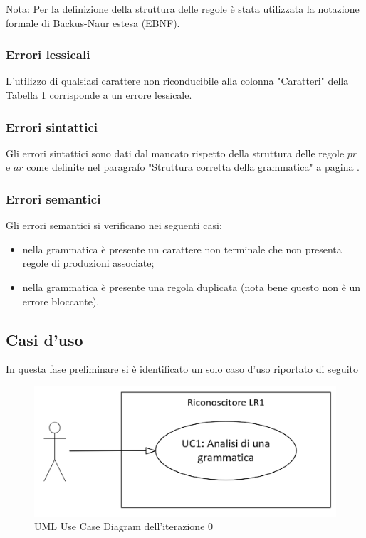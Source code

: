 \documentclass[12pt]{article}
\begin{document}
\underline{Nota:} Per la definizione della struttura delle regole è stata utilizzata la notazione formale di Backus-Naur estesa (EBNF).

\subsubsection{Errori lessicali}
L'utilizzo di qualsiasi carattere non riconducibile alla colonna "Caratteri" della Tabella 1 corrisponde a un errore lessicale.

\subsubsection{Errori sintattici}
Gli errori sintattici sono dati dal mancato rispetto della struttura delle regole $pr$ e $ar$ come definite nel paragrafo "Struttura corretta della grammatica" a pagina \pageref{struttura}.

\subsubsection{Errori semantici}
Gli errori semantici si verificano nei seguenti casi:
\begin{itemize}
\item nella grammatica è presente un carattere non terminale che non presenta regole di produzioni associate;
\item nella grammatica è presente una regola duplicata (\underline{nota bene} questo \underline{non} è un errore bloccante).
\end{itemize}
\pagebreak

\subsection{Casi d'uso}
In questa fase preliminare si è identificato un solo caso d'uso riportato di seguito

\begin{figure}[h]
\centering
\includegraphics[scale=1]{immagini/UC_v1.png}
\caption{UML Use Case Diagram dell'iterazione 0}
\end{figure}
\end{document}
